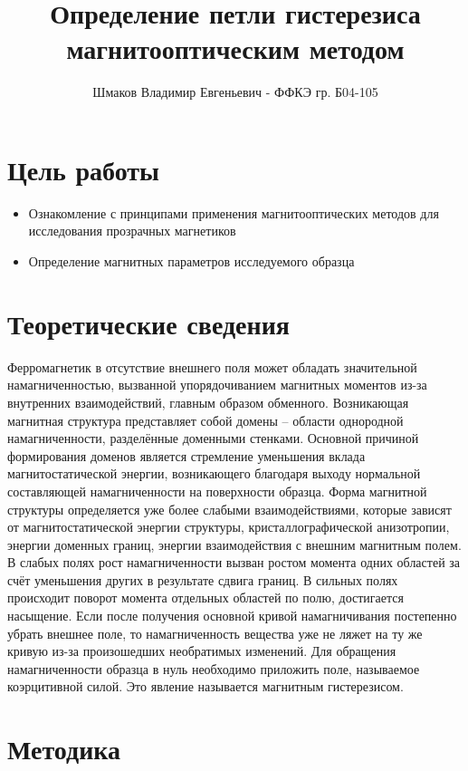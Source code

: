 \documentclass[a4paper, 12pt]{extarticle}
\title{\textcolor{main_title}{Определение петли гистерезиса магнитооптическим методом}}
\author{Шмаков Владимир Евгеньевич - ФФКЭ гр. Б04-105}
\begin{document}
\maketitle



\section*{\textcolor{header}{Цель работы}}
\begin{itemize}
    \item Ознакомление с принципами применения магнитооптических методов для исследования прозрачных магнетиков
    \item Определение магнитных параметров исследуемого образца 
\end{itemize}


\section*{\textcolor{header}{Теоретические сведения}}

Ферромагнетик в отсутствие внешнего поля может обладать значительной намагниченностью, вызванной упорядочиванием магнитных моментов из-за внутренних взаимодействий, главным образом обменного.
Возникающая магнитная структура представляет собой домены – области однородной намагниченности, разделённые доменными стенками. 
Основной причиной формирования доменов является стремление уменьшения вклада магнитостатической энергии, возникающего благодаря выходу нормальной составляющей намагниченности на поверхности образца. 
Форма магнитной структуры определяется уже более слабыми взаимодействиями, которые зависят от магнитостатической энергии структуры, кристаллографической анизотропии, энергии доменных границ, энергии взаимодействия с внешним магнитным полем.
В слабых полях рост намагниченности вызван ростом момента одних областей за счёт уменьшения других в результате сдвига границ. 
В сильных полях происходит поворот момента отдельных областей по полю, достигается насыщение. 
Если после получения основной кривой намагничивания постепенно убрать внешнее поле, то намагниченность вещества уже не ляжет на ту же кривую из-за произошедших необратимых изменений. 
Для обращения намагниченности образца в нуль необходимо приложить поле, называемое коэрцитивной силой. 
Это явление называется \textcolor{defenition}{магнитным гистерезисом}. 



\section*{\textcolor{header}{Методика}}
\end{document}
